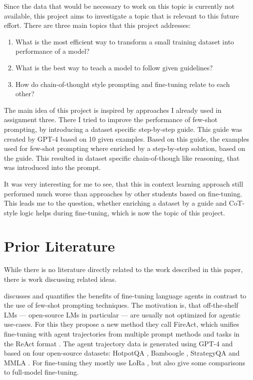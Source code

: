 \documentclass[11pt]{article}
\begin{document}
    Since the data that would be necessary to work on this topic is currently not available, this project aims to
    investigate a topic that is relevant to this future effort.
    There are three main topics that this project addresses:
    \begin{enumerate}
        \item What is the most efficient way to transform a small training dataset into performance of a model?
        \item What is the best way to teach a model to follow given guidelines?
        \item How do chain-of-thought style prompting and fine-tuning relate to each other?
    \end{enumerate}

    The main idea of this project is inspired by approaches I already used in assignment three.
    There I tried to improve the performance of few-shot prompting, by introducing a dataset specific step-by-step guide.
    This guide was created by GPT-4 based on 10 given examples.
    Based on this guide, the examples used for few-shot prompting where enriched by a step-by-step solution, based on the guide.
    This resulted in dataset specific chain-of-though like reasoning, that was introduced into the prompt.

    It was very interesting for me to see, that this in context learning approach still performed much worse than
    approaches by other students based on fine-tuning.
    This leads me to the question, whether enriching a dataset by a guide and CoT-style logic helps during fine-tuning,
    which is now the topic of this project.


    \section{Prior Literature}
    While there is no literature directly related to the work described in this paper, there is work discussing related ideas.

    \cite{chen_fireact_2023} discusses and quantifies the benefits of fine-tuning language
    agents in contrast to the use of few-shot prompting techniques.
    The motivation is, that off-the-shelf LMs --- open-source LMs in particular --- are usually not optimized for agentic use-cases.
    For this they propose a new method they call FireAct, which unifies fine-tuning with agent trajectories from
    multiple prompt methods and tasks in the ReAct format \cite{yao_react_2023}.
    The agent trajectory data is generated using GPT-4 and based on four open-source datasets:
    HotpotQA \cite{yang_hotpotqa_2018}, Bamboogle \cite{press_measuring_2023}, StrategyQA \cite{geva_did_2021} and
    MMLA \cite{hendrycks_measuring_2021}.
    For fine-tuning they mostly use LoRa \cite{hu_lora_2021}, but also give some comparisons to full-model fine-tuning.
\end{document}
